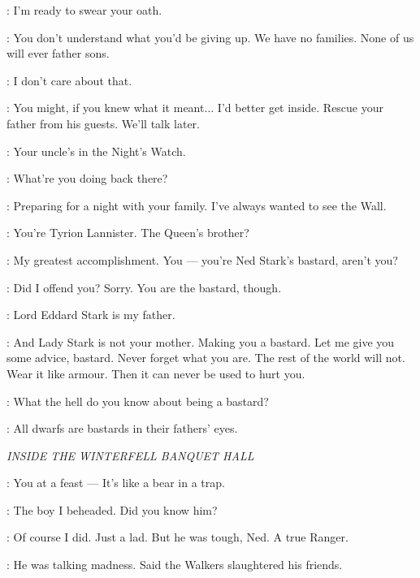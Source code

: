 \JON: I'm ready to swear your oath. 

\BENJEN: You don't understand what you'd be giving up. We have no families. None of us will ever father sons. 

\JON: I don't care about that. 

\BENJEN: You might, if you knew what it meant$\ldots$ I'd better get inside. Rescue your father from his guests. We'll talk later. 


\TYRION: Your uncle's in the Night's Watch. 

\JON: What're you doing back there? 

\TYRION: Preparing for a night with your family. I've always wanted to see the Wall. 

\JON: You're Tyrion Lannister. The Queen's brother? 

\TYRION: My greatest accomplishment. You --- you're Ned Stark's bastard, aren't you? 


\TYRION: Did I offend you? Sorry. You are the bastard, though. 

\JON: Lord Eddard Stark is my father. 

\TYRION: And Lady Stark is not your mother. Making you a bastard. Let me give you some advice, bastard. Never forget what you are. The rest of the world will not. Wear it like armour. Then it can never be used to hurt you. 

\JON: What the hell do you know about being a bastard? 

\TYRION: All dwarfs are bastards in their fathers' eyes. 



\scene

\textit{INSIDE THE WINTERFELL BANQUET HALL} 


\BENJEN: You at a feast --- It's like a bear in a trap. 

\NED: The boy I beheaded. Did you know him? 

\BENJEN: Of course I did. Just a lad. But he was tough, Ned. A true Ranger. 

\NED: He was talking madness. Said the Walkers slaughtered his friends. 

